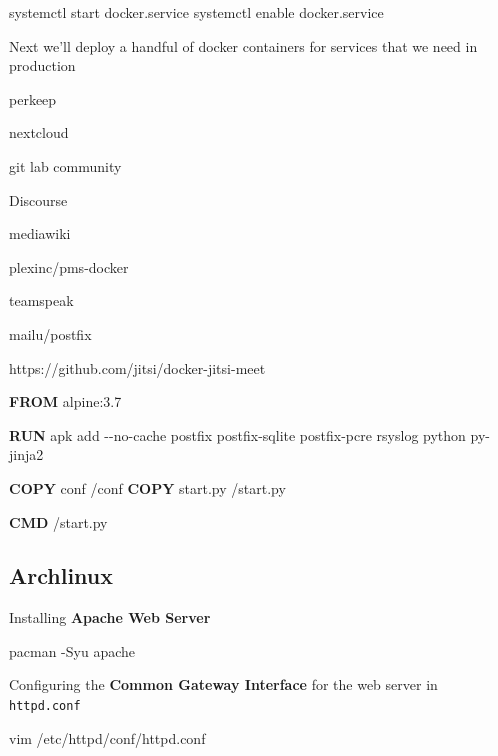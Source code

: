 \documentclass[
  14pt,
  english,
  a4paper,
]{scrreprt}
\newenvironment{Shaded}{}{}
\newcommand{\ExtensionTok}[1]{#1}
\newcommand{\KeywordTok}[1]{\textcolor[rgb]{0.00,0.44,0.13}{\textbf{#1}}}
\newcommand{\NormalTok}[1]{#1}
\begin{document}
\begin{Shaded}
\begin{Highlighting}[]
\ExtensionTok{systemctl}\NormalTok{ start docker.service}
\ExtensionTok{systemctl}\NormalTok{ enable docker.service}
\end{Highlighting}
\end{Shaded}

Next we'll deploy a handful of docker containers for services that we
need in production

perkeep

nextcloud

git lab community

Discourse

mediawiki

plexinc/pms-docker

teamspeak

mailu/postfix

https://github.com/jitsi/docker-jitsi-meet

\begin{Shaded}
\begin{Highlighting}[]
\KeywordTok{FROM}\NormalTok{ alpine:3.7}

\KeywordTok{RUN}\NormalTok{ apk add {-}{-}no{-}cache postfix postfix{-}sqlite postfix{-}pcre rsyslog python py{-}jinja2}

\KeywordTok{COPY}\NormalTok{ conf /conf}
\KeywordTok{COPY}\NormalTok{ start.py /start.py}

\KeywordTok{CMD}\NormalTok{ /start.py}
\end{Highlighting}
\end{Shaded}

\hypertarget{archlinux}{%
\subsection{Archlinux}\label{archlinux}}

Installing \textbf{Apache Web Server}

\begin{Shaded}
\begin{Highlighting}[]
\ExtensionTok{pacman}\NormalTok{ {-}Syu apache}
\end{Highlighting}
\end{Shaded}

Configuring the \textbf{Common Gateway Interface} for the web server in
\texttt{httpd.conf}

\begin{Shaded}
\begin{Highlighting}[]
\ExtensionTok{vim}\NormalTok{ /etc/httpd/conf/httpd.conf}
\end{Highlighting}
\end{Shaded}
\end{document}
